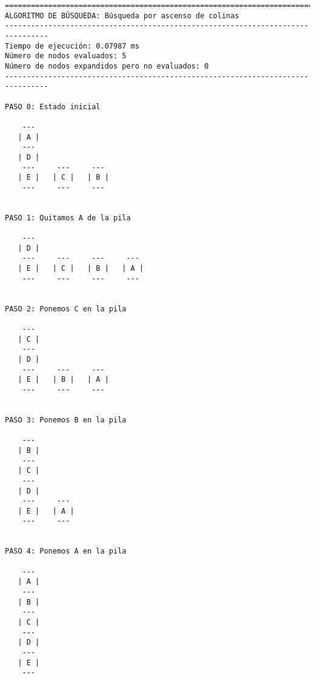 \documentclass[11pt]{article}
\begin{document}
    \begin{Verbatim}[commandchars=\\\{\}]
================================================================================
ALGORITMO DE BÚSQUEDA: Búsqueda por ascenso de colinas
--------------------------------------------------------------------------------
Tiempo de ejecución: 0.07987 ms
Número de nodos evaluados: 5
Número de nodos expandidos pero no evaluados: 0
--------------------------------------------------------------------------------

PASO 0: Estado inicial

    --- 
   | A |
    --- 
   | D |
    ---     ---     --- 
   | E |   | C |   | B |
    ---     ---     --- 


PASO 1: Quitamos A de la pila

    --- 
   | D |
    ---     ---     ---     --- 
   | E |   | C |   | B |   | A |
    ---     ---     ---     --- 


PASO 2: Ponemos C en la pila

    --- 
   | C |
    --- 
   | D |
    ---     ---     --- 
   | E |   | B |   | A |
    ---     ---     --- 


PASO 3: Ponemos B en la pila

    --- 
   | B |
    --- 
   | C |
    --- 
   | D |
    ---     --- 
   | E |   | A |
    ---     --- 


PASO 4: Ponemos A en la pila

    --- 
   | A |
    --- 
   | B |
    --- 
   | C |
    --- 
   | D |
    --- 
   | E |
    --- 


    \end{Verbatim}


    
    
    
    
\end{document}
